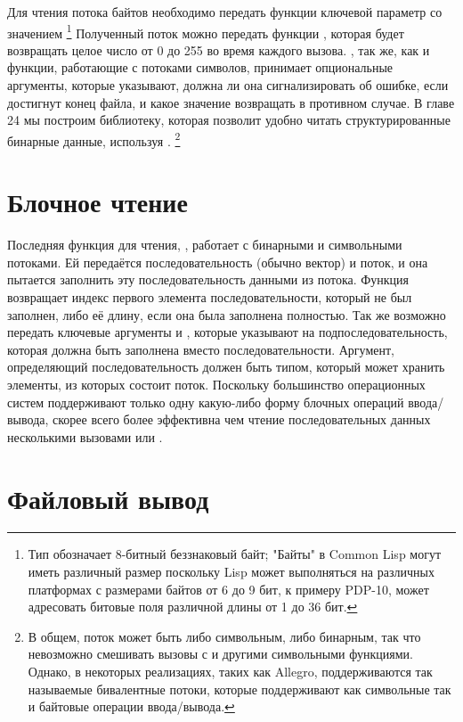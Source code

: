 Для чтения потока байтов необходимо передать функции  ключевой параметр
 со значением  \footnote{Тип
   обозначает 8-битный беззнаковый байт; "Байты" в Common Lisp
  могут иметь различный размер поскольку Lisp может выполняться на различных платформах с
  размерами байтов от 6 до 9 бит, к примеру PDP-10, может адресовать битовые поля
  различной длины от 1 до 36 бит.} Полученный поток можно передать функции
, которая будет возвращать целое число от 0 до 255 во время каждого
вызова. , так же, как и функции, работающие с потоками символов, принимает
опциональные аргументы, которые указывают, должна ли она сигнализировать об ошибке, если
достигнут конец файла, и какое значение возвращать в противном случае. В главе 24 мы
построим библиотеку, которая позволит удобно читать структурированные бинарные данные,
используя . \footnote{В общем, поток может быть либо символьным, либо
  бинарным, так что невозможно смешивать вызовы  с  и
  другими символьными функциями. Однако, в некоторых реализациях, таких как Allegro,
  поддерживаются так называемые бивалентные потоки, которые поддерживают как символьные
  так и байтовые операции ввода/вывода.}

\section{Блочное чтение}

Последняя функция для чтения, , работает с бинарными и символьными
потоками. Ей передаётся последовательность (обычно вектор) и поток, и она пытается
заполнить эту последовательность данными из потока. Функция возвращает индекс первого
элемента последовательности, который не был заполнен, либо её длину, если она была
заполнена полностью. Так же возможно передать ключевые аргументы  и
, которые указывают на подпоследовательность, которая должна быть заполнена
вместо последовательности. Аргумент, определяющий последовательность должен быть типом,
который может хранить элементы, из которых состоит поток. Поскольку большинство
операционных систем поддерживают только одну какую-либо форму блочных операций
ввода/вывода,  скорее всего более эффективна чем чтение
последовательных данных несколькими вызовами  или .

\section{Файловый вывод}

